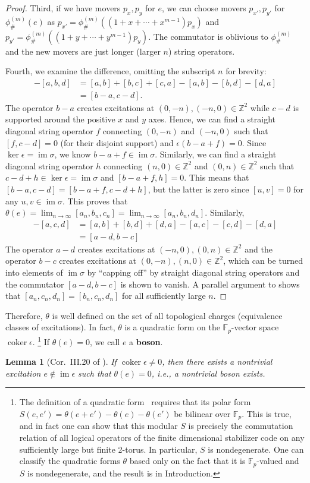 \documentclass[aps,pra,
floatfix,notitlepage,
nofootinbib,
longbibliography,11pt]{revtex4-1}
\newtheorem{lemma}{Lemma}[section]
\theoremstyle{definition}
\newcommand{\ZZ}{{\mathbb{Z}}}
\newcommand{\FF}{{\mathbb{F}}}
\newcommand{\cg}[1]{{\phi_\#^{({#1})}}}
\DeclareMathOperator{\im}{\mathrm{im}}
\DeclareMathOperator{\coker}{\mathrm{coker}}
\begin{document}
\begin{proof}
Third, if we have movers $p_x,p_y$ for $e$,
we can choose movers $p_{x'}, p_{y'}$ for $\cg{m}(e)$
as $p_{x'} = \cg{m}((1+x+\cdots+ x^{m-1})p_x)$ 
and $p_{y'} = \cg{m}((1+y+\cdots+y^{m-1})p_y)$.
The commutator is oblivious to $\cg{m}$ 
and the new movers are just longer (larger $n$) string operators.

Fourth, we examine the difference, omitting the subscript $n$ for brevity:
\begin{align}
[a,b,c] - [a,b,d]
&=
[a,b]+[b,c]+[c,a] - [a,b]-[b,d]-[d,a] \nonumber \\
&= [b-a,c-d] .
\end{align}
The operator $b-a$ creates excitations at $(0,-n),(-n,0) \in \ZZ^2$
while $c-d$ is supported around the positive $x$ and $y$ axes.
Hence, we can find a straight diagonal string operator $f$ connecting $(0,-n)$ and $(-n,0)$
such that $[f,c-d] =0$ (for their disjoint support) and $\epsilon(b-a+f) = 0$.
Since $\ker \epsilon = \im \sigma$,
we know $b-a+f \in \im \sigma$.
Similarly, we can find a straight diagonal string operator $h$ 
connecting $(n,0) \in \ZZ^2$ and $(0,n) \in \ZZ^2$
such that $c-d+h \in \ker \epsilon = \im \sigma$ and $[b-a+f,h ] = 0$.
This means that $[b-a,c-d] = [b-a+f,c-d+h]$, but the latter is zero 
since $[u,v]=0$ for any $u,v \in \im \sigma$.
This proves that $\theta(e) = \lim_{n \to\infty}[a_n,b_n,c_n] = \lim_{n \to \infty} [a_n,b_n,d_n]$.
Similarly,
\begin{align}
[a,b,d] - [a,c,d] 
&= [a,b]+[b,d]+[d,a] - [a,c] - [c,d] - [d,a]\nonumber\\
&= [a-d,b-c]
\end{align}
The operator $a-d$ creates excitations at $(-n,0),(0,n) \in \ZZ^2$
and the operator $b-c$ creates excitations at $(0,-n), (n,0) \in \ZZ^2$,
which can be turned into elements of $\im \sigma$ 
by ``capping off'' by straight diagonal string operators
and the commutator $[a-d,b-c]$ is shown to vanish.
A parallel argument to shows that $[a_n,c_n,d_n] = [b_n,c_n,d_n]$ for all sufficiently large $n$. 
\end{proof}

Therefore, $\theta$ is well defined on the set of all topological charges
(equivalence classes of excitations).
In fact, $\theta$ is a quadratic form on the $\FF_p$-vector space $\coker \epsilon$.%
\footnote{
The definition of a quadratic form~\cite{Kniga}
requires that its polar form $S(e,e') = \theta(e+e')-\theta(e)-\theta(e')$ be bilinear over $\FF_p$.
This is true, and in fact one can show that this modular $S$ is precisely
the commutation relation of all logical operators of the finite dimensional stabilizer code
on any sufficiently large but finite 2-torus.
In particular, $S$ is nondegenerate.
One can classify the quadratic forms $\theta$ based only on the fact that it is $\FF_p$-valued
and $S$ is nondegenerate, and the result is in Introduction.
}
If $\theta(e) = 0$, we call $e$ a {\bf boson}.
\begin{lemma}[Cor.~III.20 of \cite{HFH2018}]\label{lem:isotropic}
If $\coker \epsilon \neq 0$, 
then there exists a nontrivial excitation $e \notin \im \epsilon$ such that $\theta(e) = 0$,
i.e., a nontrivial boson exists.
\end{lemma}
\end{document}
